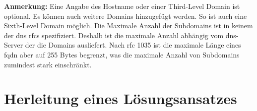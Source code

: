 \documentclass[titlepage]{report}
\begin{document}
\textbf{Anmerkung:} Eine Angabe des Hostname oder einer Third-Level
Domain ist optional. Es können auch weitere Domains hinzugefügt werden.
So ist auch eine Sixth-Level Domain möglich. Die Maximale Anzahl der
Subdomains ist in keinem der \gls{dns} \glspl{rfc} spezifiziert. Deshalb
ist die maximale Anzahl abhängig vom \gls{dns}\hyp{}Server der die
Domains ausliefert. Nach \gls{rfc} 1035 ist die maximale Länge eines
\gls{fqdn} aber auf 255 Bytes begrenzt\cite[siehe Section
2.3.4]{RFC1035}, was die maximale Anzahl von Subdomains zumindest stark
einschränkt.
\section*{}
\section*{}
\section*{}
\section*{}
\chapter*{Herleitung eines Lösungsansatzes}
\end{document}
